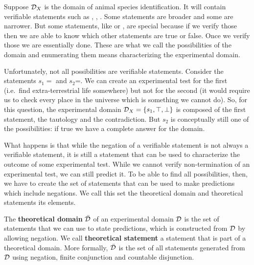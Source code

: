 \documentclass[11pt,letterpaper,fleqn]{memoir} %
\begin{document}
Suppose $\mathcal{D}_X$ is the domain of animal species identification. It will contain verifiable statements such as , , . Some statements are broader and some are narrower. But some statements, like  or , are special because if we verify those then we are able to know which other statements are true or false. Once we verify those we are essentially done. These are what we call the possibilities of the domain and enumerating them means characterizing the experimental domain.

Unfortunately, not all possibilities are verifiable statements. Consider the statements $s_1=$ and $s_2$=. We can create an experimental test for the first (i.e.~find extra-terrestrial life somewhere) but not for the second (it would require us to check every place in the universe which is something we cannot do). So, for this question, the experimental domain $\mathcal{D}_X = \{s_1, \top, \bot\}$ is composed of the first statement, the tautology and the contradiction. But $s_2$ is conceptually still one of the possibilities: if true we have a complete answer for the domain.

What happens is that while the negation of a verifiable statement is not always a verifiable statement, it is still a statement that can be used to characterize the outcome of some experimental test. While we cannot verify non-termination of an experimental test, we can still predict it. To be able to find all possibilities, then, we have to create the set of statements that can be used to make predictions which include negations. We call this set the theoretical domain and theoretical statements its elements.

\begin{mathSection}
\begin{defn}
	The \textbf{theoretical domain} $\bar{\mathcal{D}}$ of an experimental domain $\mathcal{D}$ is the set of statements that we can use to state predictions, which is constructed from $\mathcal{D}$ by allowing negation. We call \textbf{theoretical statement} a statement that is part of a theoretical domain. More formally, $\bar{\mathcal{D}}$ is the set of all statements generated from $\mathcal{D}$ using negation, finite conjunction and countable disjunction.
\end{defn}
\end{mathSection}
\end{document}
